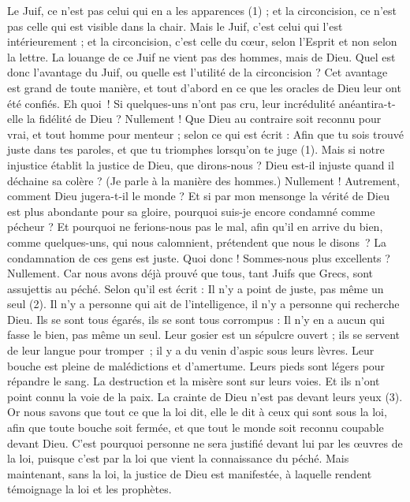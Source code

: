 \begin{multicols}{2}
Le Juif, ce n’est pas celui qui en a les apparences (1) ; et la circoncision, ce n’est pas celle qui est visible dans la chair.
Mais le Juif, c’est celui qui l’est intérieurement ; et la circoncision, c’est celle du cœur, selon l’Esprit et non selon la lettre. La louange de ce Juif ne vient pas des hommes, mais de Dieu.
\VerseOne{}Quel est donc l'avantage du Juif, ou quelle est l’utilité de la circoncision ?
Cet avantage est grand de toute manière, et tout d’abord en ce que les oracles de Dieu leur ont été confiés.
Eh quoi ! Si quelques-uns n'ont pas cru, leur incrédulité anéantira-t-elle la fidélité de Dieu ?
Nullement ! Que Dieu au contraire soit reconnu pour vrai, et tout homme pour menteur ; selon ce qui est écrit : Afin que tu sois trouvé juste dans tes paroles, et que tu triomphes lorsqu’on te juge (1).
Mais si notre injustice établit la justice de Dieu, que dirons-nous ? Dieu est-il injuste quand il déchaine sa colère ? (Je parle à la manière des hommes.)
Nullement ! Autrement, comment Dieu jugera-t-il le monde ?
Et si par mon mensonge la vérité de Dieu est plus abondante pour sa gloire, pourquoi suis-je encore condamné comme pécheur ?
Et pourquoi ne ferions-nous pas le mal, afin qu'il en arrive du bien, comme quelques-uns, qui nous calomnient, prétendent que nous le disons ? La condamnation de ces gens est juste.
Quoi donc ! Sommes-nous plus excellents ? Nullement. Car nous avons déjà prouvé que tous, tant Juifs que Grecs, sont assujettis au péché.
Selon qu'il est écrit : Il n'y a point de juste, pas même un seul (2).
Il n'y a personne qui ait de l'intelligence, il n'y a personne qui recherche Dieu.
Ils se sont tous égarés, ils se sont tous corrompus : Il n'y en a aucun qui fasse le bien, pas même un seul.
Leur gosier est un sépulcre ouvert ; ils se servent de leur langue pour tromper ; il y a du venin d'aspic sous leurs lèvres.
Leur bouche est pleine de malédictions et d'amertume.
Leurs pieds sont légers pour répandre le sang.
La destruction et la misère sont sur leurs voies.
Et ils n'ont point connu la voie de la paix.
La crainte de Dieu n'est pas devant leurs yeux (3).
Or nous savons que tout ce que la loi dit, elle le dit à ceux qui sont sous la loi, afin que toute bouche soit fermée, et que tout le monde soit reconnu coupable devant Dieu.
C'est pourquoi personne ne sera justifié devant lui par les œuvres de la loi, puisque c’est par la loi que vient la connaissance du péché.
Mais maintenant, sans la loi, la justice de Dieu est manifestée, à laquelle rendent témoignage la loi et les prophètes.

\end{multicols}
